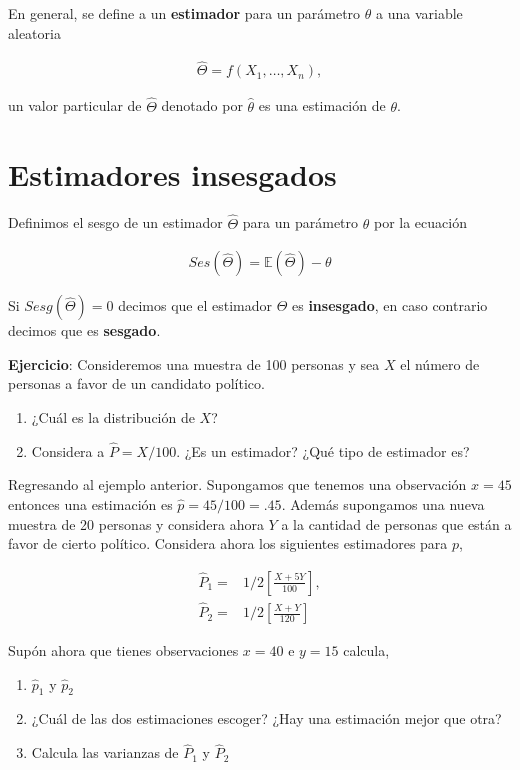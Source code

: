 \documentclass{article}
\newcommand{\Esp}{\mathbb{E}}
\begin{document}
En general, se define a un \textbf{estimador} para un parámetro $\theta$ a una variable aleatoria 

\begin{align*}
    \hat{\Theta} = f(X_1, \dots , X_n),
\end{align*}

un valor particular de $\hat{\Theta}$ denotado por $\hat{\theta}$ es una estimación de $\theta$. 

\section{Estimadores insesgados}

Definimos el sesgo de un estimador $\hat{\Theta}$ para un parámetro $\theta$ por la ecuación

\begin{align*}
    Ses(\hat{\Theta})= \Esp (\hat{\Theta})- \theta
\end{align*}

Si $Sesg(\hat{\Theta})=0$ decimos que el estimador $\hat{\Theta}$ es \textbf{insesgado}, en caso contrario decimos que es \textbf{sesgado}.

\textbf{Ejercicio}:
Consideremos una muestra de 100 personas y sea $X$ el número de personas a favor de un candidato político. 

\begin{enumerate}
    \item ¿Cuál es la distribución de $X$?
    \item Considera a $\hat{P}=X/100$. ¿Es un estimador? ¿Qué tipo de estimador es?
\end{enumerate}




Regresando al ejemplo anterior. Supongamos que tenemos una observación $x=45$ entonces una estimación es $\hat{p}=45/100=.45$. Además supongamos una nueva muestra de 20 personas y considera ahora $Y$ a la cantidad de personas que están a favor de cierto político. Considera ahora los siguientes estimadores para $p$,

\begin{align}
    \hat{P}_1 = &  1/2 \left[ \frac{X+5Y}{100} \right], \\
    \hat{P}_2 = &  1/2 \left[ \frac{X+Y}{120} \right]
\end{align}

Supón ahora que tienes observaciones $x=40$ e $y=15$ calcula,
\begin{enumerate}
    \item $\hat{p}_1$ y $\hat{p}_2$
    \item ¿Cuál de las dos estimaciones escoger? ¿Hay una estimación mejor que otra?
    \item Calcula las varianzas de $\hat{P}_1$ y $\hat{P}_2$
\end{enumerate}
\end{document}
